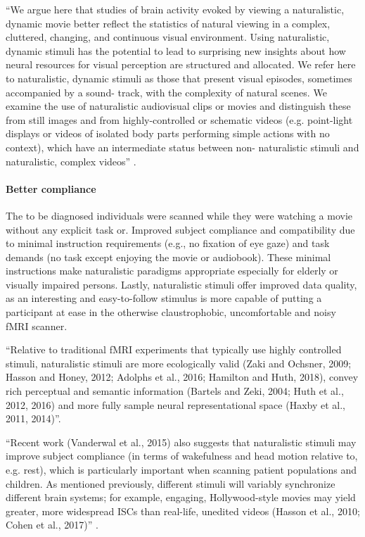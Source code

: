 ``We argue here that studies of brain activity evoked by viewing a naturalistic,
dynamic movie better reﬂect the statistics of natural viewing in a complex,
cluttered, changing, and continuous visual environment. Using naturalistic,
dynamic stimuli has the potential to lead to surprising new insights about how
neural resources for visual perception are structured and allocated. We refer
here to naturalistic, dynamic stimuli as those that present visual episodes,
sometimes accompanied by a sound- track, with the complexity of natural scenes.
We examine the use of naturalistic audiovisual clips or movies and distinguish
these from still images and from highly-controlled or schematic videos (e.g.
point-light displays or videos of isolated body parts performing simple actions
with no context), which have an intermediate status between non- naturalistic
stimuli and naturalistic, complex videos'' \citep{haxby2020naturalistic}.


\paragraph{Better compliance}

%
The to be diagnosed individuals were scanned while they were watching a movie
without any explicit task or.
%
Improved subject compliance and compatibility due to minimal instruction
requirements (e.g., no fixation of eye gaze) and task demands (no task except
enjoying the movie or audiobook).
%
These minimal instructions make naturalistic paradigms appropriate especially
for elderly or visually impaired persons.
%
Lastly, naturalistic stimuli offer improved data quality, as an interesting and
easy-to-follow stimulus is more capable of putting a participant at ease in the
otherwise claustrophobic, uncomfortable and noisy fMRI scanner.

``Relative to traditional fMRI experiments that typically use highly controlled
stimuli, naturalistic stimuli are more ecologically valid (Zaki and Ochsner,
2009; Hasson and Honey, 2012; Adolphs et al., 2016; Hamilton and Huth, 2018),
convey rich perceptual and semantic information (Bartels and Zeki, 2004; Huth et
al., 2012, 2016) and more fully sample neural representational space (Haxby et
al., 2011, 2014)''\citep{nastase2019measuring}.

``Recent work (Vanderwal et al., 2015) also suggests that naturalistic stimuli
may improve subject compliance (in terms of wakefulness and head motion relative
to, e.g. rest), which is particularly important when scanning patient
populations and children. As mentioned previously, different stimuli will
variably synchronize different brain systems; for example, engaging,
Hollywood-style movies may yield greater, more widespread ISCs than real-life,
unedited videos (Hasson et al., 2010; Cohen et al., 2017)''
\citep{nastase2019measuring}.

